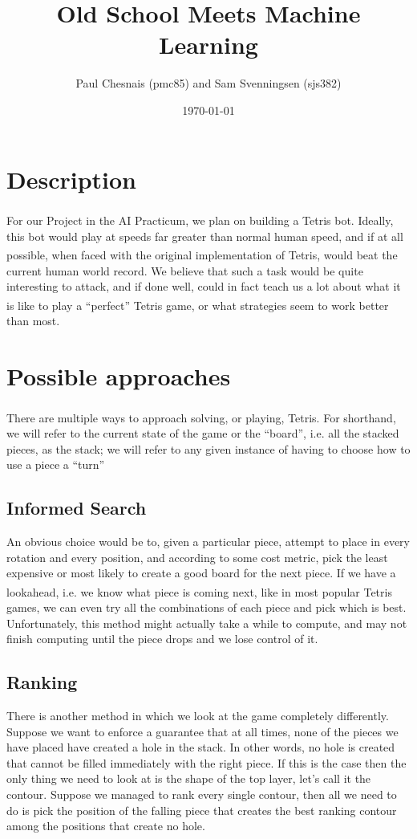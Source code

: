 \documentclass{article}
\title{Old School \tetris{} Meets Machine Learning}
\author{Paul Chesnais (pmc85) and Sam Svenningsen (sjs382)}
\date{\today}
\def\tetris{Tetris\textsuperscript{\textregistered}}
\begin{document}
\maketitle
\thispagestyle{empty}

\section{Description}

\par For our Project in the AI Practicum, we plan on building a \tetris{} bot. Ideally, this bot would play at speeds far greater than normal human speed, and if at all possible, when faced with the original implementation of \tetris{}, would beat the current human world record. We believe that such a task would be quite interesting to attack, and if done well, could in fact teach us a lot about what it is like to play a ``perfect'' \tetris{} game, or what strategies seem to work better than most.

\section{Possible approaches}

\par There are multiple ways to approach solving, or playing, \tetris{}. For shorthand, we will refer to the current state of the game or the ``board'', i.e. all the stacked pieces, as the stack; we will refer to any given instance of having to choose how to use a piece a ``turn''

\subsection{Informed Search} An obvious choice would be to, given a particular piece, attempt to place in every rotation and every position, and according to some cost metric, pick the least expensive or most likely to create a good board for the next piece. If we have a lookahead, i.e. we know what piece is coming next, like in most popular \tetris{} games, we can even try all the combinations of each piece and pick which is best. Unfortunately, this method might actually take a while to compute, and may not finish computing until the piece drops and we lose control of it.

\subsection{Ranking} There is another method in which we look at the game completely differently. Suppose we want to enforce a guarantee that at all times, none of the pieces we have placed have created a hole in the stack. In other words, no hole is created that cannot be filled immediately with the right piece. If this is the case then the only thing we need to look at is the shape of the top layer, let's call it the contour. Suppose we managed to rank every single contour, then all we need to do is pick the position of the falling piece that creates the best ranking contour among the positions that create no hole.
\end{document}
